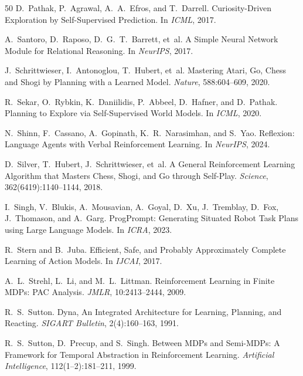 \documentclass{article}
\begin{document}
\begin{thebibliography}{50}
D.~Pathak, P.~Agrawal, A.~A.~Efros, and T.~Darrell.
\newblock Curiosity-Driven Exploration by Self-Supervised Prediction.
\newblock In \emph{ICML}, 2017.

A.~Santoro, D.~Raposo, D.~G.~T.~Barrett, et~al.
\newblock A Simple Neural Network Module for Relational Reasoning.
\newblock In \emph{NeurIPS}, 2017.

J.~Schrittwieser, I.~Antonoglou, T.~Hubert, et~al.
\newblock Mastering Atari, Go, Chess and Shogi by Planning with a Learned Model.
\newblock \emph{Nature}, 588:604--609, 2020.

R.~Sekar, O.~Rybkin, K.~Daniilidis, P.~Abbeel, D.~Hafner, and D.~Pathak.
\newblock Planning to Explore via Self-Supervised World Models.
\newblock In \emph{ICML}, 2020.

N.~Shinn, F.~Cassano, A.~Gopinath, K.~R.~Narasimhan, and S.~Yao.
\newblock Reflexion: Language Agents with Verbal Reinforcement Learning.
\newblock In \emph{NeurIPS}, 2024.

D.~Silver, T.~Hubert, J.~Schrittwieser, et~al.
\newblock A General Reinforcement Learning Algorithm that Masters Chess, Shogi, and Go through Self-Play.
\newblock \emph{Science}, 362(6419):1140--1144, 2018.

I.~Singh, V.~Blukis, A.~Mousavian, A.~Goyal, D.~Xu, J.~Tremblay, D.~Fox, J.~Thomason, and A.~Garg.
\newblock ProgPrompt: Generating Situated Robot Task Plans using Large Language Models.
\newblock In \emph{ICRA}, 2023.

R.~Stern and B.~Juba.
\newblock Efficient, Safe, and Probably Approximately Complete Learning of Action Models.
\newblock In \emph{IJCAI}, 2017.

A.~L.~Strehl, L.~Li, and M.~L.~Littman.
\newblock Reinforcement Learning in Finite MDPs: PAC Analysis.
\newblock \emph{JMLR}, 10:2413--2444, 2009.

R.~S.~Sutton.
\newblock Dyna, An Integrated Architecture for Learning, Planning, and Reacting.
\newblock \emph{SIGART Bulletin}, 2(4):160--163, 1991.

R.~S.~Sutton, D.~Precup, and S.~Singh.
\newblock Between MDPs and Semi-MDPs: A Framework for Temporal Abstraction in Reinforcement Learning.
\newblock \emph{Artificial Intelligence}, 112(1--2):181--211, 1999.


\end{thebibliography}
\end{document}
